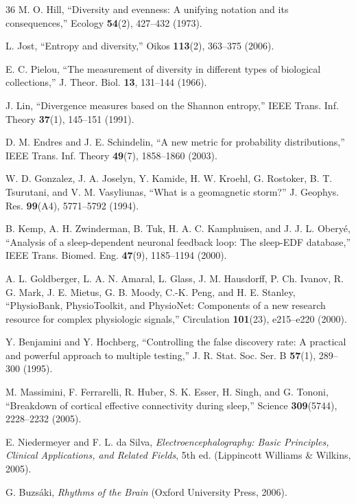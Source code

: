 \documentclass[aip,cha,reprint,amsmath,amssymb,final,floatfix]{revtex4-2}
\begin{document}
\begin{thebibliography}{36}
 M. O. Hill, ``Diversity and evenness: A unifying notation and its consequences,'' Ecology \textbf{54}(2), 427--432 (1973).

 L. Jost, ``Entropy and diversity,'' Oikos \textbf{113}(2), 363--375 (2006).

 E. C. Pielou, ``The measurement of diversity in different types of biological collections,'' J. Theor. Biol. \textbf{13}, 131--144 (1966).

 J. Lin, ``Divergence measures based on the Shannon entropy,'' IEEE Trans. Inf. Theory \textbf{37}(1), 145--151 (1991).

 D. M. Endres and J. E. Schindelin, ``A new metric for probability distributions,'' IEEE Trans. Inf. Theory \textbf{49}(7), 1858--1860 (2003).

 W. D. Gonzalez, J. A. Joselyn, Y. Kamide, H. W. Kroehl, G. Rostoker, B. T. Tsurutani, and V. M. Vasyliunas, ``What is a geomagnetic storm?'' J. Geophys. Res. \textbf{99}(A4), 5771--5792 (1994).

 B. Kemp, A. H. Zwinderman, B. Tuk, H. A. C. Kamphuisen, and J. J. L. Obery{\'e}, ``Analysis of a sleep-dependent neuronal feedback loop: The sleep-EDF database,'' IEEE Trans. Biomed. Eng. \textbf{47}(9), 1185--1194 (2000).

 A. L. Goldberger, L. A. N. Amaral, L. Glass, J. M. Hausdorff, P. Ch. Ivanov, R. G. Mark, J. E. Mietus, G. B. Moody, C.-K. Peng, and H. E. Stanley, ``PhysioBank, PhysioToolkit, and PhysioNet: Components of a new research resource for complex physiologic signals,'' Circulation \textbf{101}(23), e215--e220 (2000).

 Y. Benjamini and Y. Hochberg, ``Controlling the false discovery rate: A practical and powerful approach to multiple testing,'' J. R. Stat. Soc. Ser. B \textbf{57}(1), 289--300 (1995).

 M. Massimini, F. Ferrarelli, R. Huber, S. K. Esser, H. Singh, and G. Tononi, ``Breakdown of cortical effective connectivity during sleep,'' Science \textbf{309}(5744), 2228--2232 (2005).

 E. Niedermeyer and F. L. da Silva, \emph{Electroencephalography: Basic Principles, Clinical Applications, and Related Fields}, 5th ed. (Lippincott Williams \& Wilkins, 2005).

 G. Buzs{\'a}ki, \emph{Rhythms of the Brain} (Oxford University Press, 2006).


\end{thebibliography}
\end{document}
